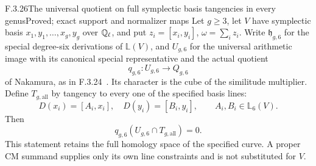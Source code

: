 \begin{result}{F.3.26}{The universal quotient on full symplectic basis tangencies in every genus}{Proved; exact support and normalizer maps}
Let $g\geq3$, let $V$ have symplectic basis
$x_1,y_1,\ldots,x_g,y_g$ over $\mathbb Q_\ell$, and put
$z_i=[x_i,y_i]$, $\omega=\sum_i z_i$.
Write $\mathfrak h_{g,6}$ for the special degree-six
derivations of $\mathbb L(V)$, and $U_{g,6}$ for the
universal arithmetic image with its canonical special
representative and the actual quotient
\[
                 q_{g,6}:U_{g,6}\longrightarrow Q_{g,6}
\]
of Nakamura, as in F.3.24~\cite[pp.~115--117]{AuditNakamura1996}. Its character is the cube
of the similitude multiplier. Define $T_{g,\mathrm{all}}$
by tangency to every one of the specified basis lines:
\[
 D(x_i)=[A_i,x_i],\quad D(y_i)=[B_i,y_i],
 \qquad A_i,B_i\in\mathbb L_6(V).
\]
Then
\[
                 q_{g,6}(U_{g,6}\cap T_{g,\mathrm{all}})=0.
                                                               \tag{AG.1}
\]
This statement retains the full homology space of the
specified curve. A proper CM summand supplies only its
own line constraints and is not substituted for $V$.

\end{result}
